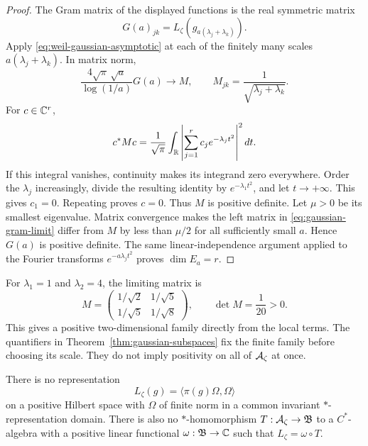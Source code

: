 \begin{proof}
The Gram matrix of the displayed functions is the real symmetric matrix
\[
 G(a)_{jk}=L_\zeta(g_{a(\lambda_j+\lambda_k)}).
\]
Apply \eqref{eq:weil-gaussian-asymptotic} at each of the finitely many
scales $a(\lambda_j+\lambda_k)$.  In matrix norm,
\begin{equation}
 \frac{4\sqrt\pi\,\sqrt a}{\log(1/a)}G(a)
 \longrightarrow M,
 \qquad M_{jk}=\frac1{\sqrt{\lambda_j+\lambda_k}}.
 \label{eq:gaussian-gram-limit}
\end{equation}
For $c\in\mathbb C^r$,
\begin{equation}
 c^*Mc=\frac1{\sqrt\pi}\int_{\mathbb R}
       \left|\sum_{j=1}^r c_j e^{-\lambda_j t^2}\right|^2dt.
 \label{eq:limiting-gaussian-gram}
\end{equation}
If this integral vanishes, continuity makes its integrand zero everywhere.
Order the $\lambda_j$ increasingly, divide the resulting identity by
$e^{-\lambda_1t^2}$, and let $t\to+\infty$.
This gives $c_1=0$.  Repeating proves $c=0$.
Thus $M$ is positive definite.
Let $\mu>0$ be its smallest eigenvalue.  Matrix convergence makes the
left matrix in \eqref{eq:gaussian-gram-limit} differ from $M$ by less
than $\mu/2$ for all sufficiently small $a$.
Hence $G(a)$ is positive definite.
The same linear-independence argument applied to the Fourier transforms
$e^{-a\lambda_jt^2}$ proves $\dim E_a=r$.
\end{proof}

For $\lambda_1=1$ and $\lambda_2=4$, the limiting matrix is
\[
 M=\begin{pmatrix}1/\sqrt2&1/\sqrt5\\1/\sqrt5&1/\sqrt8\end{pmatrix},
 \qquad\det M=\frac1{20}>0.
\]
This gives a positive two-dimensional family directly from the local terms.
The quantifiers in Theorem~\ref{thm:gaussian-subspaces} fix the finite family
before choosing its scale.  They do not imply positivity on all of
$\mathcal A_\zeta$ at once.

\begin{corollary}
\label{cor:weil-carriers}
There is no representation
\[
 L_\zeta(g)=\langle\pi(g)\Omega,\Omega\rangle
\]
on a positive Hilbert space with $\Omega$ of finite norm in a common
invariant $*$-representation domain.
There is also no $*$-homomorphism $T:\mathcal A_\zeta\to\mathfrak B$ to a
$C^*$-algebra with a positive linear functional
$\omega:\mathfrak B\to\mathbb C$ such that $L_\zeta=\omega\circ T$.
\end{corollary}

